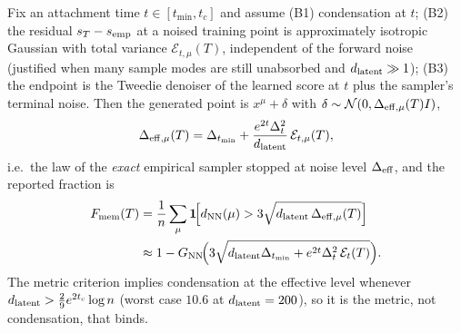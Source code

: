 \begin{proposition}\label{prop:bridge-main}
Fix an attachment time $t\in[t_{\min},t_c]$ and assume (B1) condensation at $t$; (B2) the residual $s_T-s_{\rm emp}$ at a noised training point is approximately isotropic Gaussian with total variance $\mathcal E_{t,\mu}(T)$, independent of the forward noise (justified when many sample modes are still unabsorbed and $d_{\mathrm{latent}}\gg1$); (B3) the endpoint is the Tweedie denoiser of the learned score at $t$ plus the sampler's terminal noise. Then the generated point is $x^\mu+\delta$ with $\delta\sim\mathcal N(0,\Delta_{\rm eff,\mu}(T)I)$,
\begin{equation}\label{eq:Deff-main}
\Delta_{\rm eff,\mu}(T)=\Delta_{t_{\min}}+\frac{e^{2t}\Delta_t^{2}}{d_{\mathrm{latent}}}\,\mathcal E_{t,\mu}(T),
\end{equation}
i.e.\ the law of the \emph{exact} empirical sampler stopped at noise level $\Delta_{\rm eff}$, and the reported fraction is
\begin{align}
F_{\rm mem}(T)&=\frac1{n}\sum_\mu\mathbf 1\!\Bigl[d_{\rm NN}(\mu)>3\sqrt{d_{\mathrm{latent}}\,\Delta_{\rm eff,\mu}(T)}\Bigr]\label{eq:Fmem-main}\\
&\approx1-G_{\rm NN}\!\Bigl(3\sqrt{d_{\mathrm{latent}}\Delta_{t_{\min}}+e^{2t}\Delta_t^{2}\,\mathcal E_t(T)}\Bigr).\nonumber
\end{align}
The metric criterion implies condensation at the effective level whenever $d_{\mathrm{latent}}>\tfrac29e^{2t_c}\log n$ (worst case $10.6$ at $d_{\mathrm{latent}}=200$), so it is the metric, not condensation, that binds.
\end{proposition}

